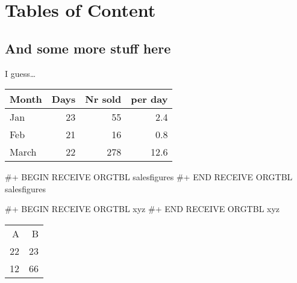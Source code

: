 \documentclass[11pt]{article}
\begin{document}
\section{Tables of Content}
\label{sec-4}

\listoflistings


\listoftables

\subsection{And some more stuff here}
\label{sec-4-1}
I guess\ldots{}

\begin{center}
\begin{tabular}{lrrr}
Month & Days & Nr sold & per day\\
\hline
Jan & 23 & 55 & 2.4\\
Feb & 21 & 16 & 0.8\\
March & 22 & 278 & 12.6\\
\end{tabular}
\end{center}

\#+ BEGIN RECEIVE ORGTBL salesfigures
\#+ END RECEIVE ORGTBL salesfigures


\#+ BEGIN RECEIVE ORGTBL xyz
\#+ END RECEIVE ORGTBL xyz

\begin{center}
\begin{tabular}{rr}
A & B\\
22 & 23\\
12 & 66\\
\end{tabular}
\end{center}
\end{document}
